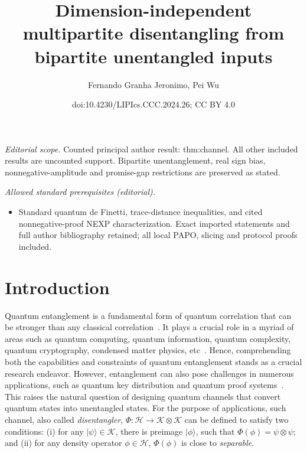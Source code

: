 \documentclass[10pt,a4paper]{article}
\title{Dimension-independent multipartite disentangling from bipartite unentangled inputs}
\author{Fernando Granha Jeronimo, Pei Wu}
\date{doi:10.4230/LIPIcs.CCC.2024.26; CC BY 4.0}
\theoremstyle{remark}
\def\to{\rightarrow}
\newcommand{\cH}{\mathcal{H}}
\newcommand{\1}[1]{\mathds{1}{[#1]}}
\newcommand{\ket}[1]{\lvert #1\rangle}
\newcommand{\cK}{\mathcal{K}}
\numberwithin{equation}{section}
\begin{document}
\maketitle
\noindent\textit{Editorial scope.} Counted principal author result: thm:channel. All other included results are uncounted support. Bipartite unentanglement, real sign bias, nonnegative-amplitude and promise-gap restrictions are preserved as stated.\par\medskip
\noindent\textit{Allowed standard prerequisites (editorial).}\begin{itemize}
\item Standard quantum de Finetti, trace-distance inequalities, and cited nonnegative-proof NEXP characterization. Exact imported statements and full author bibliography retained; all local PAPO, slicing and protocol proofs included.
\end{itemize}\medskip
\section{Introduction}

Quantum entanglement is a fundamental form of quantum correlation that
can be stronger than any classical correlation~\cite{EPR35, B64,CHSH69,JNVWY20}.
%
It plays a crucial role in a myriad of areas such as quantum computing, quantum information,
quantum complexity, quantum cryptography, condensed matter physics, etc~\cite{HHHH09,NC10,Watrous18}.
%
Hence, comprehending both the capabilities and constraints of quantum entanglement stands
as a crucial research endeavor.
%
However, entanglement can also pose challenges in numerous applications, such as quantum
key distribution and quantum proof systems~\cite{Renner08,KMY03,OW16,HHJWY17}.
%
This raises the natural question of designing quantum channels that convert quantum states
into unentangled states. 
%
For the purpose of applications, such channel, also called \emph{disentangler}, $\Phi: \cH \to \cK\otimes\cK$ can be defined to satisfy two
conditions: (i) for any $\ket\psi\in\cK$, there is preimage $\ket\phi$, such that $\Phi(\phi)=\psi\otimes\psi$;
and (ii) for any density operator $\phi\in \cH$, $\Phi(\phi)$ is close to \emph{separable}. 
\end{document}
